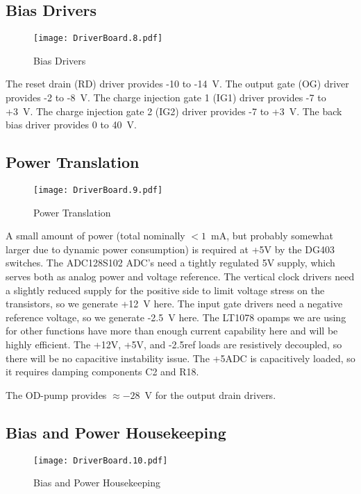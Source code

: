 \subsection{Bias Drivers}
   \begin{figure}
   \begin{center}
   \texttt{[image: DriverBoard.8.pdf]}
   \end{center}
   \caption{Bias Drivers}
   \end{figure}
  
The reset drain (RD) driver provides -10 to -14\ V. 
The output gate (OG) driver provides -2 to -8\ V.
The charge injection gate 1 (IG1) driver provides -7 to +3\ V.
The charge injection gate 2 (IG2) driver provides -7 to +3\ V.
The back bias driver provides 0 to 40\ V.


\subsection{Power Translation}
   \begin{figure}
   \begin{center}
   \texttt{[image: DriverBoard.9.pdf]}
   \end{center}
   \caption{Power Translation}
   \end{figure}
  
A small amount of power (total nominally $<1$\ mA, but probably somewhat larger due to dynamic power consumption) is required at +5V by the DG403 switches. The ADC128S102 ADC's need a tightly regulated 5V supply, which serves both as analog power and voltage reference. The vertical clock drivers need a slightly reduced supply for the positive side to limit voltage stress on the transistors, so we generate +12\ V here. The input gate drivers need a negative reference voltage, so we generate -2.5\ V here. The LT1078 opamps we are using for other functions have more than enough current capability here and will be highly efficient. The +12V, +5V, and -2.5ref loads are resistively decoupled, so there will be no capacitive instability issue. The +5ADC is capacitively loaded, so it requires damping components C2 and R18.

  
The OD-pump provides $\approx -28$\ V for the output drain drivers.

\subsection{Bias and Power Housekeeping}
   \begin{figure}
   \begin{center}
   \texttt{[image: DriverBoard.10.pdf]}
   \end{center}
   \caption{Bias and Power Housekeeping}
   \end{figure}

